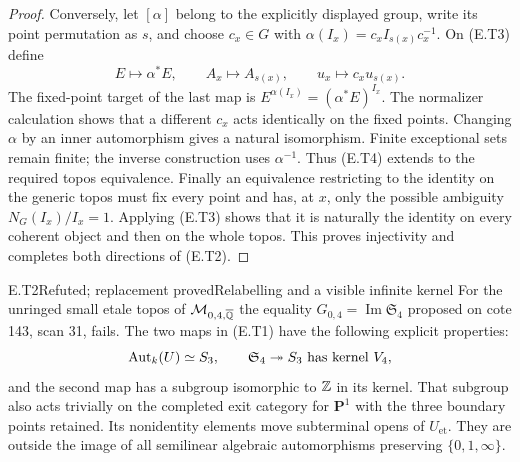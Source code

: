 \begin{proof}
Conversely, let $[\alpha]$ belong to the explicitly displayed group,
write its point permutation as $s$, and choose $c_x\in G$ with
$\alpha(I_x)=c_xI_{s(x)}c_x^{-1}$.  On (E.T3) define
\[
 E\longmapsto\alpha^*E,\qquad
 A_x\longmapsto A_{s(x)},\qquad
 u_x\longmapsto c_xu_{s(x)}.
 \tag{E.T4}
\]
The fixed-point target of the last map is
$E^{\alpha(I_x)}=(\alpha^*E)^{I_x}$.  The normalizer calculation
shows that a different $c_x$ acts identically on the fixed points.
Changing $\alpha$ by an inner automorphism gives a natural
isomorphism.  Finite exceptional sets remain finite; the inverse
construction uses $\alpha^{-1}$.  Thus (E.T4) extends to the required
topos equivalence.  Finally an equivalence restricting to the
identity on the generic topos must fix every point and has, at $x$,
only the possible ambiguity $N_G(I_x)/I_x=1$.  Applying (E.T3)
shows that it is naturally the identity on every coherent object
and then on the whole topos.  This proves injectivity and completes
both directions of (E.T2).
\end{proof}

\begin{result}{E.T2}{Refuted; replacement proved}{Relabelling and a visible infinite kernel}
For the unringed small etale topos of
$\mathcal M_{0,4,\overline{\mathbb Q}}$ the equality
$G_{0,4}=\operatorname{Im}\mathfrak S_4$ proposed on cote 143,
scan 31, fails.  The two maps in (E.T1) have the following
explicit properties:
\[
 \operatorname{Aut}_k(U)\simeq S_3,\qquad
 \mathfrak S_4\twoheadrightarrow S_3
 \text{ has kernel }V_4,
\]
and the second map has a subgroup isomorphic to $\mathbb Z$ in its kernel.
That subgroup also acts trivially on the completed exit category
for $\mathbf P^1$ with the three boundary points retained.
Its nonidentity elements move subterminal opens of
$U_{\mathrm{et}}$.  They are outside the image of all semilinear
algebraic automorphisms preserving $\{0,1,\infty\}$.
\end{result}

